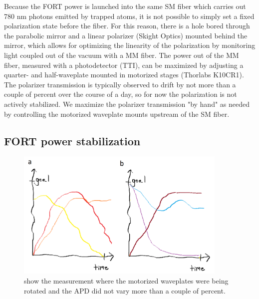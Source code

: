 
Because the FORT power is launched into the same SM fiber which carries out 780 nm photons emitted by trapped atoms, it is not possible to simply set a fixed polarization state before the fiber. For this reason, there is a hole bored through the parabolic mirror and a linear polarizer (Skight Optics) mounted behind the mirror, which allows for optimizing the linearity of the polarization by monitoring light coupled out of the vacuum with a MM fiber. The power out of the MM fiber, measured with a photodetector (TTI), can be maximized by adjusting a quarter- and half-waveplate mounted in motorized stages (Thorlabs K10CR1). The polarizer transmission is typically observed to drift by not more than a couple of percent over the course of a day, so for now the polarization is not actively stabilized. We maximize the polarizer transmission "by hand" as needed by controlling the motorized waveplate mounts upstream of the SM fiber.


\subsection{FORT power stabilization}

\begin{figure}[!ht]
    \centering
    \includegraphics[width=0.9\textwidth]{Images/fig_coming_soon.png}
    \caption{show the measurement where the motorized waveplates were being rotated and the APD did not vary more than a couple of percent.}
    \label{fig:FORTAPDpolarizationtest}
\end{figure}

